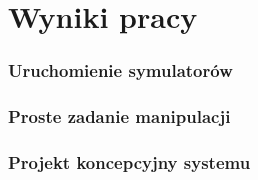 \section{Wyniki pracy}


\begin{frame}
    \frametitle{Uruchomienie symulatorów}
\end{frame}


\begin{frame}
    \frametitle{Proste zadanie manipulacji}
\end{frame}


\begin{frame}
	\frametitle{Projekt koncepcyjny systemu}
\end{frame}

